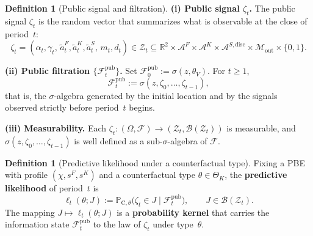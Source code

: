 \documentclass[12pt]{article}
\numberwithin{equation}{section}
\numberwithin{table}{section}
\theoremstyle{definition}
\newtheorem{definition}[theorem]{Definition}
\newcommand{\ProbC}[1]{\mathbb{P}_{\mathrm{C},#1}}
\begin{document}

\begin{definition}[Public signal and filtration]
\label{def:zeta-filtration}
\noindent\textbf{(i) Public signal $\zeta_t$.}
The public signal $\zeta_t$ is the random vector that summarizes what is
observable at the close of period~$t$:
\[
\zeta_t=(\alpha_t,\gamma_t,\,\tilde{a}_t^F,\tilde{a}_t^K,\tilde{a}_t^S,\,m_t,d_t)
\in
\mathcal{Z}_t\subseteq\mathbb{R}^2\times\mathcal{A}^F\times\mathcal{A}^K
\times\mathcal{A}^{S,\mathrm{disc}}\times\mathcal{M}_{\mathrm{out}}\times\{0,1\}.
\]

\noindent\textbf{(ii) Public filtration $\{\mathcal{F}_t^{\mathrm{pub}}\}$.}
Set $\mathcal{F}_0^{\mathrm{pub}}:=\sigma(z,\theta_V)$. For $t\ge 1$,
\[
\mathcal{F}_t^{\mathrm{pub}}:=\sigma(z,\zeta_0,\ldots,\zeta_{t-1}),
\]
that is, the $\sigma$-algebra generated by the initial location and by the
signals observed strictly before period~$t$ begins.

\noindent\textbf{(iii) Measurability.}
Each $\zeta_t:(\Omega,\mathcal{F})\to(\mathcal{Z}_t,\mathcal{B}(\mathcal{Z}_t))$
is measurable, and $\sigma(z,\zeta_0,\ldots,\zeta_{t-1})$ is well defined as a
sub-$\sigma$-algebra of $\mathcal{F}$.
\end{definition}

\bigskip

\begin{definition}[Predictive likelihood under a counterfactual type]
\label{def:predictive-likelihood}
Fixing a PBE with profile $(\chi,s^F,s^K)$ and a counterfactual type
$\theta\in\Theta_K$, the \textbf{predictive likelihood} of period~$t$ is
\begin{equation}
\label{eq:likelihood-zeta}
\ell_t(\theta;J)
:=\ProbC{\theta}\bigl(\zeta_t\in J\mid\mathcal{F}_t^{\mathrm{pub}}\bigr),
\qquad J\in\mathcal{B}(\mathcal{Z}_t).
\end{equation}
The mapping $J\mapsto\ell_t(\theta;J)$ is a \textbf{probability kernel} that
carries the information state $\mathcal{F}_t^{\mathrm{pub}}$ to the law of
$\zeta_t$ under type~$\theta$.
\end{definition}

\bigskip
\end{document}
